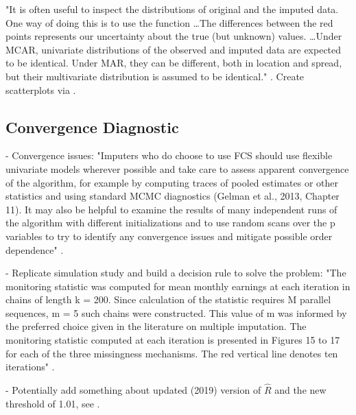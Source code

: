 \documentclass[article]{jss}
\newcommand{\fct}[1]{\code{#1()}}
\begin{document}
"It is often useful to inspect the distributions of original and the imputed data. One way of doing this is to use the function \fct{stripplot} \dots  The differences between the
red points represents our uncertainty about the true (but unknown) values. \dots Under MCAR, univariate distributions of the observed and imputed data are expected to be identical. Under MAR, they can be different, both in location and spread, but their multivariate distribution is assumed to be identical." \cite[p.~12]{mice}. Create scatterplots via \fct{xyplot}.


\subsection{Convergence Diagnostic} \label{sec:convergence}

- Convergence issues: "Imputers who do choose to use FCS should use flexible univariate models wherever possible and take care to assess apparent convergence of the algorithm, for example by computing traces of pooled estimates or other statistics and using standard MCMC diagnostics (Gelman et al., 2013, Chapter 11). It may also be helpful to examine the results of many independent runs of the algorithm with different initializations and to use random scans over the p variables to try to identify any convergence issues and mitigate possible order dependence" \cite[p.~19]{murr18}.

- Replicate simulation study and build a decision rule to solve the problem: "The monitoring statistic was computed for mean monthly earnings at each iteration in chains of length k = 200. Since calculation of the statistic requires M parallel sequences, m = 5 such chains were constructed. This value of m was informed by the preferred choice given in the literature on multiple imputation. The monitoring statistic computed at each iteration is presented in Figures 15 to 17 for each of the three missingness mechanisms. The red vertical line denotes ten iterations" \cite[p.~49]{lace07}. %

- Potentially add something about updated (2019) version of $\widehat{R}$ and the new threshold of 1.01, see \citep{veht19}.
\end{document}
